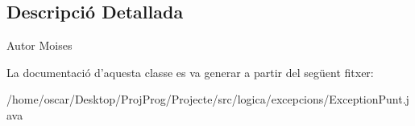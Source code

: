 \subsection{Descripció Detallada}
\begin{DoxyAuthor}{Autor}
Moises 
\end{DoxyAuthor}


La documentació d'aquesta classe es va generar a partir del següent fitxer\+:\begin{DoxyCompactItemize}
\item 
/home/oscar/\+Desktop/\+Proj\+Prog/\+Projecte/src/logica/excepcions/Exception\+Punt.\+java\end{DoxyCompactItemize}
